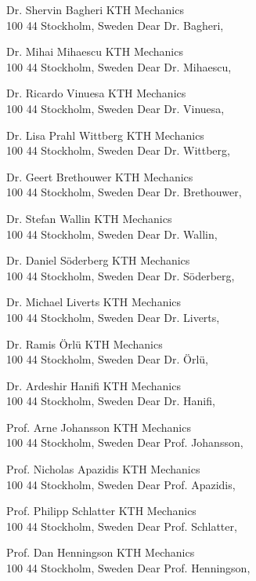 %
%
%
%

Dr. Shervin Bagheri
KTH Mechanics\\100 44 Stockholm, Sweden
Dear Dr. Bagheri,

Dr. Mihai Mihaescu
KTH Mechanics\\100 44 Stockholm, Sweden
Dear Dr. Mihaescu,

Dr. Ricardo Vinuesa
KTH Mechanics\\100 44 Stockholm, Sweden
Dear Dr. Vinuesa,

Dr. Lisa Prahl Wittberg
KTH Mechanics\\100 44 Stockholm, Sweden
Dear Dr. Wittberg,

Dr. Geert Brethouwer
KTH Mechanics\\100 44 Stockholm, Sweden
Dear Dr. Brethouwer,

Dr. Stefan Wallin
KTH Mechanics\\100 44 Stockholm, Sweden
Dear Dr. Wallin,

Dr. Daniel S\"oderberg
KTH Mechanics\\100 44 Stockholm, Sweden
Dear Dr. S\"oderberg,

Dr. Michael Liverts
KTH Mechanics\\100 44 Stockholm, Sweden
Dear Dr. Liverts,

Dr. Ramis \"Orl\"u
KTH Mechanics\\100 44 Stockholm, Sweden
Dear Dr. \"Orl\"u,

Dr. Ardeshir Hanifi
KTH Mechanics\\100 44 Stockholm, Sweden
Dear Dr. Hanifi,

Prof. Arne Johansson
KTH Mechanics\\100 44 Stockholm, Sweden
Dear Prof. Johansson,

Prof. Nicholas Apazidis
KTH Mechanics\\100 44 Stockholm, Sweden
Dear Prof. Apazidis,

Prof. Philipp Schlatter
KTH Mechanics\\100 44 Stockholm, Sweden
Dear Prof. Schlatter,

Prof. Dan Henningson
KTH Mechanics\\100 44 Stockholm, Sweden
Dear Prof. Henningson,

